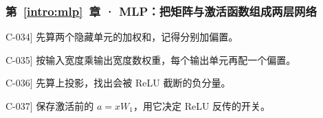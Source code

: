 \subsubsection*{第~\ref*{intro:mlp}~章 · MLP：把矩阵与激活函数组成两层网络}
\begin{answerhints}
\item[\hyperref[exercise:mlp-activation-forward]{C-034}] \leavevmode{}\label{hint:mlp-activation-forward}先算两个隐藏单元的加权和，记得分别加偏置。
\item[\hyperref[exercise:mlp-parameter-count]{C-035}] \leavevmode{}\label{hint:mlp-parameter-count}按输入宽度乘输出宽度数权重，每个输出单元再配一个偏置。
\item[\hyperref[exercise:mlp-negative-activation]{C-036}] \leavevmode{}\label{hint:mlp-negative-activation}先算上投影，找出会被 ReLU 截断的负分量。
\item[\hyperref[exercise:mlp-linear-composition]{C-037}] \leavevmode{}\label{hint:mlp-linear-composition}保存激活前的 $a=xW_1$，用它决定 ReLU 反传的开关。
\end{answerhints}
